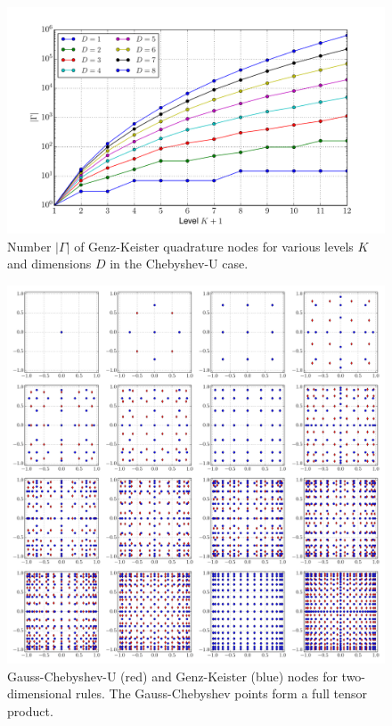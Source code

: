 \documentclass[a4paper,10pt]{article}
\begin{document}
\begin{figure}
  \centering
  \includegraphics[width=\linewidth]{./img/number_nodes_levdim_chebyshevu.pdf}
  \caption{Number $|\Gamma|$ of Genz-Keister quadrature nodes for various
  levels $K$ and dimensions $D$ in the Chebyshev-U case.}
  \label{fig:number_nodes_levdim_chebyshevu}
\end{figure}

\begin{figure}[h]
  \centering
  \includegraphics[width=\linewidth]{./img/gk_chebyshevu_nodes_2d.pdf}
  \caption{Gauss-Chebyshev-U (red) and Genz-Keister (blue) nodes for
  two-dimensional rules. The Gauss-Chebyshev points form a full tensor
  product.}
  \label{fig:gk_chebyshevu_nodes_2d}
\end{figure}
\end{document}
